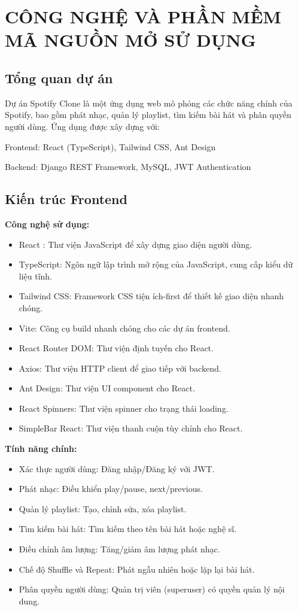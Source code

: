 \documentclass[a4paper]{article}
\begin{document}
\section{{CÔNG NGHỆ VÀ PHẦN MỀM MÃ NGUỒN MỞ SỬ DỤNG}}
    \subsection{Tổng quan dự án}
    \textbf{}
    Dự án Spotify Clone là một ứng dụng web mô phỏng các chức năng chính của Spotify, bao gồm phát nhạc, quản lý playlist, tìm kiếm bài hát và phân quyền người dùng. Ứng dụng được xây dựng với:
    
    Frontend: React (TypeScript), Tailwind CSS, Ant Design
    
    Backend: Django REST Framework, MySQL, JWT Authentication
    \subsection{Kiến trúc Frontend}
    \textbf{Công nghệ sử dụng:}\\
    \begin{itemize}
        \item React : Thư viện JavaScript để xây dựng giao diện người dùng.
        \item TypeScript: Ngôn ngữ lập trình mở rộng của JavaScript, cung cấp kiểu dữ liệu tĩnh.
        \item Tailwind CSS: Framework CSS tiện ích-first để thiết kế giao diện nhanh chóng.
        \item Vite: Công cụ build nhanh chóng cho các dự án frontend.
        \item React Router DOM: Thư viện định tuyến cho React.
        \item Axios: Thư viện HTTP client để giao tiếp với backend.
        \item Ant Design: Thư viện UI component cho React.
        \item React Spinners: Thư viện spinner cho trạng thái loading.
        \item SimpleBar React: Thư viện thanh cuộn tùy chỉnh cho React.
    \end{itemize}
    \textbf{Tính năng chính:}\\
    \begin{itemize}
        \item Xác thực người dùng: Đăng nhập/Đăng ký với JWT.
        \item Phát nhạc: Điều khiển play/pause, next/previous.
        \item Quản lý playlist: Tạo, chỉnh sửa, xóa playlist.
        \item Tìm kiếm bài hát: Tìm kiếm theo tên bài hát hoặc nghệ sĩ.
        \item Điều chỉnh âm lượng: Tăng/giảm âm lượng phát nhạc.
        \item Chế độ Shuffle và Repeat: Phát ngẫu nhiên hoặc lặp lại bài hát.
        \item Phân quyền người dùng: Quản trị viên (superuser) có quyền quản lý nội dung.
    \end{itemize}
\end{document}
